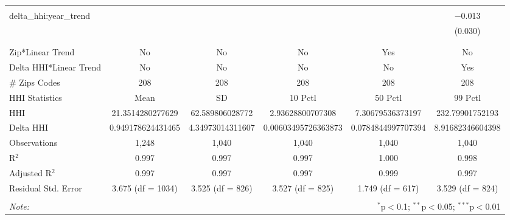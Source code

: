 \begin{table}[H]
{\begin{tabular}{@{\extracolsep{5pt}}lccccc}
   & & & & & \\  

  delta\_hhi:year\_trend &  &  &  &  & $-$0.013 \\  

   &  &  &  &  & (0.030) \\  

   & & & & & \\  

 \hline \\[-1.8ex]  

 Zip*Linear Trend & No & No & No & Yes & No \\  

 Delta HHI*Linear Trend & No & No & No & No & Yes \\  

 # Zips Codes & 208 & 208 & 208 & 208 & 208 \\  

 HHI Statistics & Mean & SD & 10 Pctl & 50 Pctl & 99 Pctl \\  

 HHI & 21.3514280277629 & 62.589806028772 & 2.93628800707308 & 7.30679536373197 & 232.79901752193 \\  

 Delta HHI & 0.949178624431465 & 4.34973014311607 & 0.00603495726363873 & 0.0784844997707394 & 8.91682346604398 \\  

 Observations & 1,248 & 1,040 & 1,040 & 1,040 & 1,040 \\  

 R$^{2}$ & 0.997 & 0.997 & 0.997 & 1.000 & 0.998 \\  

 Adjusted R$^{2}$ & 0.997 & 0.997 & 0.997 & 0.999 & 0.997 \\  

 Residual Std. Error & 3.675 (df = 1034) & 3.525 (df = 826) & 3.527 (df = 825) & 1.749 (df = 617) & 3.529 (df = 824) \\  

 \hline  

 \hline \\[-1.8ex]  

 \textit{Note:}  & \multicolumn{5}{r}{$^{*}$p$<$0.1; $^{**}$p$<$0.05; $^{***}$p$<$0.01} \\  

 \end{tabular}}  

 \end{table}  

